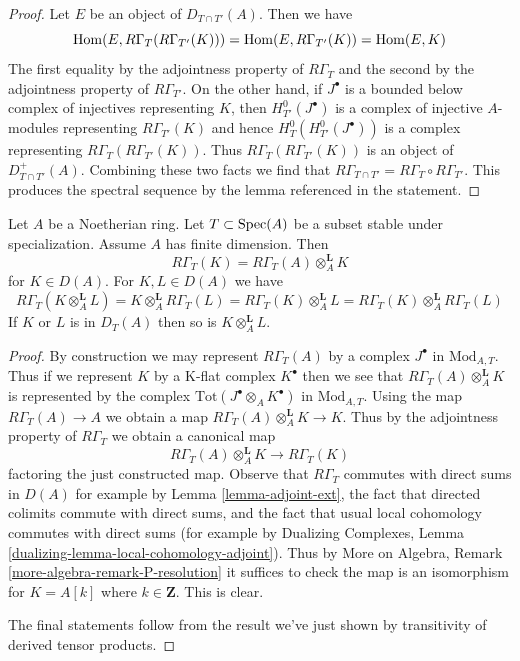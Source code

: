 \begin{proof}
Let $E$ be an object of $D_{T \cap T'}(A)$. Then we have
$$
\mathop{\mathrm{Hom}}\nolimits(E, R\Gamma_T(R\Gamma_{T'}(K))) =
\mathop{\mathrm{Hom}}\nolimits(E, R\Gamma_{T'}(K)) =
\mathop{\mathrm{Hom}}\nolimits(E, K)
$$
The first equality by the adjointness property of $R\Gamma_T$
and the second by the adjointness property of $R\Gamma_{T'}$.
On the other hand, if $J^\bullet$ is a bounded below complex
of injectives representing $K$, then $H^0_{T'}(J^\bullet)$
is a complex of injective $A$-modules representing $R\Gamma_{T'}(K)$
and hence $H^0_T(H^0_{T'}(J^\bullet))$ is a complex representing
$R\Gamma_T(R\Gamma_{T'}(K))$. Thus $R\Gamma_T(R\Gamma_{T'}(K))$
is an object of $D^+_{T \cap T'}(A)$. Combining these two
facts we find that $R\Gamma_{T \cap T'} = R\Gamma_T \circ R\Gamma_{T'}$.
This produces the spectral sequence by the lemma referenced
in the statement.
\end{proof}

\begin{lemma}
\label{lemma-torsion-tensor-product}
Let $A$ be a Noetherian ring. Let $T \subset \mathop{\mathrm{Spec}}(A)$ be a subset
stable under specialization. Assume $A$ has finite dimension. Then
$$
R\Gamma_T(K) = R\Gamma_T(A) \otimes_A^\mathbf{L} K
$$
for $K \in D(A)$. For $K, L \in D(A)$ we have
$$
R\Gamma_T(K \otimes_A^\mathbf{L} L) =
K \otimes_A^\mathbf{L} R\Gamma_T(L) =
R\Gamma_T(K) \otimes_A^\mathbf{L} L =
R\Gamma_T(K) \otimes_A^\mathbf{L} R\Gamma_T(L)
$$
If $K$ or $L$ is in $D_T(A)$ then so is $K \otimes_A^\mathbf{L} L$.
\end{lemma}

\begin{proof}
By construction we may represent $R\Gamma_T(A)$ by a complex $J^\bullet$ in
$\text{Mod}_{A, T}$. Thus if we represent $K$ by a K-flat complex $K^\bullet$
then we see that $R\Gamma_T(A) \otimes_A^\mathbf{L} K$ is represented
by the complex $\text{Tot}(J^\bullet \otimes_A K^\bullet)$ in
$\text{Mod}_{A, T}$. Using the map $R\Gamma_T(A) \to A$ we obtain
a map $R\Gamma_T(A) \otimes_A^\mathbf{L} K\to K$. Thus by the adjointness
property of $R\Gamma_T$ we obtain a canonical map
$$
R\Gamma_T(A) \otimes_A^\mathbf{L} K \longrightarrow R\Gamma_T(K)
$$
factoring the just constructed map. Observe that $R\Gamma_T$ commutes
with direct sums in $D(A)$ for example by Lemma \ref{lemma-adjoint-ext},
the fact that directed colimits commute with direct sums, and the
fact that usual local cohomology commutes with direct sums
(for example by Dualizing Complexes, Lemma
\ref{dualizing-lemma-local-cohomology-adjoint}).
Thus by More on Algebra, Remark \ref{more-algebra-remark-P-resolution}
it suffices to check the map is an isomorphism for
$K = A[k]$ where $k \in \mathbf{Z}$. This is clear.

\medskip\noindent
The final statements follow from the result we've just shown
by transitivity of derived tensor products.
\end{proof}






